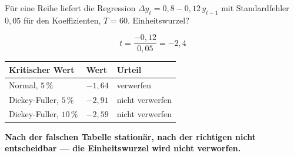 \begin{aufgabe}
Für eine Reihe liefert die Regression $\Delta y_t = 0{,}8 - 0{,}12\,y_{t-1}$ mit Standardfehler $0{,}05$ für den Koeffizienten, $T = 60$. Einheitswurzel?

\loesung
{}
\[ t = \frac{-0{,}12}{0{,}05} = -2{,}4 \]

\begin{center}
{\small
\renewcommand{\arraystretch}{1.48}
\begin{tabular}{@{}P{3.0cm}P{2.0cm}P{2.6cm}@{}}
\toprule
\textbf{Kritischer Wert} & \textbf{Wert} & \textbf{Urteil}\\
\midrule
Normal, $5\,\%$ & $-1{,}64$ & verwerfen\\
Dickey-Fuller, $5\,\%$ & $-2{,}91$ & \textcolor{akzent}{nicht verwerfen}\\
Dickey-Fuller, $10\,\%$ & $-2{,}59$ & nicht verwerfen\\
\bottomrule
\end{tabular}}
\end{center}

\begin{center}
\begin{minipage}{0.9\textwidth}
\textbf{Nach der falschen Tabelle stationär, nach der richtigen nicht entscheidbar --- die Einheitswurzel wird nicht verworfen.}
\end{minipage}
\end{center}

\begin{center}
\begin{minipage}{0.88\textwidth}
\end{minipage}
\end{center}
\end{aufgabe}

